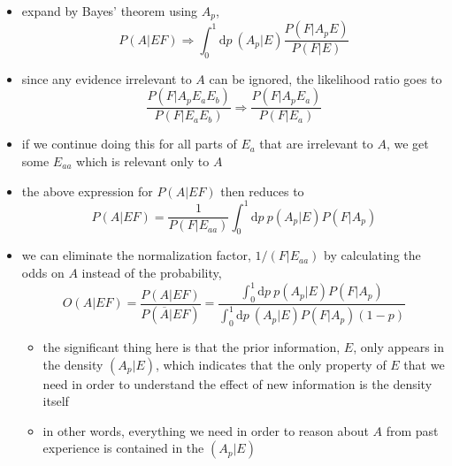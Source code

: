 \documentclass[../jaynes_prob_theory_notes.tex]{subfiles}
\begin{document}
\begin{itemize}
\begin{itemize}
                        \item expand by Bayes' theorem using \(A_p\),
                            \begin{equation} 
                                P(A|EF) \Rightarrow \int^{1}_{0}\text{d}p~(A_p|E)\frac{P(F|A_p E)}{P(F|E)}
                            \end{equation}
                        \item since any evidence irrelevant to \(A\) can be ignored, the likelihood ratio goes to
                            \begin{equation*} 
                                \frac{P(F|A_p E_a E_b)}{P(F|E_a E_b)} \Rightarrow \frac{P(F|A_p E_a)}{P(F|E_a)}
                            \end{equation*}
                        \item if we continue doing this for all parts of \(E_a\) that are irrelevant to \(A\), we get some \(E_{aa}\) which is relevant only to \(A\)
                        \item the above expression for \(P(A|EF)\) then reduces to
                            \begin{equation} 
                                \label{new_info}
                                P(A|EF) = \frac{1}{P(F|E_{aa})} \int^{1}_{0} \text{d}p~p(A_p|E)P(F|A_p)
                            \end{equation}
                        \item we can eliminate the normalization factor, \(1/(F|E_{aa})\) by calculating the odds on \(A\) instead of the probability,
                            \begin{equation*} 
                                O(A|EF) = \frac{P(A|EF)}{P(\overline{A}|EF)} = \frac{\int^{1}_{0}\text{d}p~p(A_p|E)P(F|A_p)}{\int^{1}_{0}\text{d}p~(A_p|E)P(F|A_p)(1-p)}
                            \end{equation*}
                            \begin{itemize} 
                                \item the significant thing here is that the prior information, \(E\), only appears in the density \((A_p|E)\), which indicates that the only property of \(E\) that we need in order to understand the effect of new information is the density itself
                                \item in other words, everything we need in order to reason about \(A\) from past experience is contained in the \((A_p|E)\) 

\end{itemize}
\end{itemize}
\end{itemize}
\end{document}

